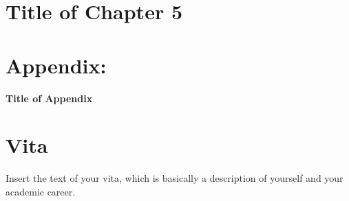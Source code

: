 \documentclass[12pt,letterpaper]{lsuetd}
\begin{document}
\chapter{Title of Chapter 5}
\doublespacing

\pagebreak
\singlespacing
%
\pagebreak
\singlespacing
{}
\renewcommand{\thesection}{A.\@arabic\c@section}
\renewcommand{\thesubsection}{A.\@arabic\c@subsection}
\renewcommand{\thesubsubsection}{A.\@arabic\c@subsubsection}
\renewcommand{\thefigure}{A.\@arabic\c@figure}
\renewcommand{\thetable}{A.\@arabic\c@table}
\appendix
\def\@makechapterhead#1{%
  {\parindent \z@ \raggedright \normalfont
    \ifnum \c@secnumdepth >\m@ne
        \huge\bfseries \@chapapp\space
        \par\nobreak
    \fi
    \interlinepenalty\@M
    \Huge \bfseries #1\par\nobreak
    \vskip 6\p@
  }}
\def\@chapter[#1]#2{\ifnum \c@secnumdepth >\m@ne
			 \refstepcounter{chapter}%
                         \typeout{\@chapapp\space\thechapter.}%
                         \addtocontents{toc}{\addvspace{12\p@}}%
                         \addcontentsline{toc}{chapter}%
                                   {\uppercase{#1}}%
                    \else
                      \addcontentsline{toc}{chapter}{#1}%
                    \fi
                    \chaptermark{#1}%
                    \if@twocolumn
                      \@topnewpage[\@makechapterhead{#2}]%
                    \else
                      \@makechapterhead{#2}%
                      \@afterheading
                    \fi}
                    
\chapter*{Appendix:} \vspace{0.7em} \hspace{-0.345in} {\huge \textbf{Title of Appendix}}
\vspace{0.3em}

\pagebreak
\chapter*{Vita}
\doublespacing
\setlength{\parindent}{1.75em}
\vspace{0.2em}
Insert the text of your vita, which is basically a description of yourself and your academic career.
\end{document}
